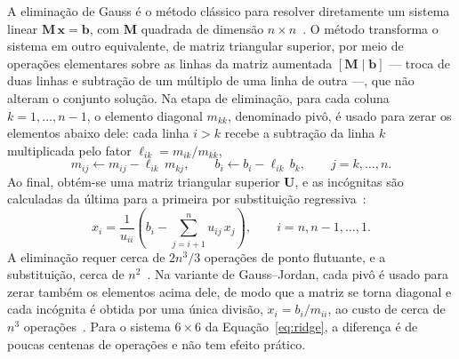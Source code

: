 A eliminação de Gauss é o método clássico para resolver diretamente um sistema linear $\mathbf{M}\,\mathbf{x} = \mathbf{b}$, com $\mathbf{M}$ quadrada de dimensão $n \times n$~\cite{burden2011numerical,golub2013matrix}. O método transforma o sistema em outro equivalente, de matriz triangular superior, por meio de operações elementares sobre as linhas da matriz aumentada $[\mathbf{M} \mid \mathbf{b}]$ --- troca de duas linhas e subtração de um múltiplo de uma linha de outra ---, que não alteram o conjunto solução. Na etapa de eliminação, para cada coluna $k = 1, \ldots, n-1$, o elemento diagonal $m_{kk}$, denominado pivô, é usado para zerar os elementos abaixo dele: cada linha $i > k$ recebe a subtração da linha $k$ multiplicada pelo fator $\ell_{ik} = m_{ik}/m_{kk}$,
\begin{equation}
    m_{ij} \leftarrow m_{ij} - \ell_{ik}\,m_{kj}, \qquad b_i \leftarrow b_i - \ell_{ik}\,b_k, \qquad j = k, \ldots, n.
    \label{eq:eliminacao}
\end{equation}
Ao final, obtém-se uma matriz triangular superior $\mathbf{U}$, e as incógnitas são calculadas da última para a primeira por substituição regressiva~\cite{burden2011numerical}:
\begin{equation}
    x_i = \frac{1}{u_{ii}} \left( b_i - \sum_{j=i+1}^{n} u_{ij}\,x_j \right), \qquad i = n, n-1, \ldots, 1.
    \label{eq:substituicao}
\end{equation}
A eliminação requer cerca de $2n^3/3$ operações de ponto flutuante, e a substituição, cerca de $n^2$~\cite{golub2013matrix}. Na variante de Gauss--Jordan, cada pivô é usado para zerar também os elementos acima dele, de modo que a matriz se torna diagonal e cada incógnita é obtida por uma única divisão, $x_i = b_i / m_{ii}$, ao custo de cerca de $n^3$ operações~\cite{burden2011numerical}. Para o sistema $6 \times 6$ da Equação~\ref{eq:ridge}, a diferença é de poucas centenas de operações e não tem efeito prático.

